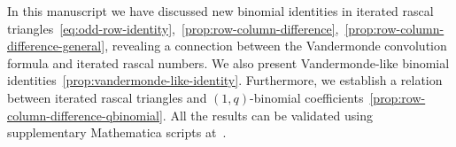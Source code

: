In this manuscript we have discussed new binomial identities in iterated rascal
triangles~\eqref{eq:odd-row-identity},~\eqref{prop:row-column-difference},~\eqref{prop:row-column-difference-general},
revealing a connection between the Vandermonde convolution formula and iterated rascal numbers.
We also present Vandermonde-like binomial identities~\eqref{prop:vandermonde-like-identity}.
Furthermore, we establish a relation between iterated rascal triangles
and $(1,q)$-binomial coefficients~\eqref{prop:row-column-difference-qbinomial}.
All the results can be validated using supplementary Mathematica scripts at~\cite{kolosov2024identities}.

